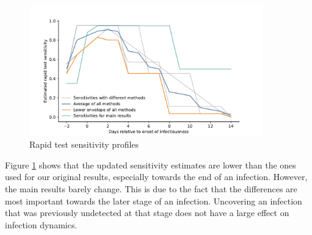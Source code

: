 {    %
    \begin{figure}
        \centering
        \includegraphics[width=0.9\textwidth]{figures/results/figures/data/testing/sensitivity_params_with_different_methods}
        \caption{Rapid test sensitivity profiles}
        \label{fig:sensitivity_assumptions}
    \end{figure}


    Figure \ref{fig:sensitivity_assumptions} shows that the updated sensitivity
    estimates are lower than the ones used for our original results, especially towards
    the end of an infection. However, the main results barely change. This is due to the
    fact that the differences are most important towards the later stage of an
    infection. Uncovering an infection that was previously undetected at that stage does
    not have a large effect on infection dynamics.

    \begin{figure}
        \centering


\end{figure}}

